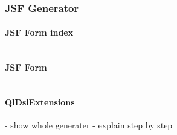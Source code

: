\subsubsection {JSF Generator}
\label{sec:jsfGenerator}
 
 
 \paragraph{JSF Form index}
$\;$ \\ 
\paragraph{JSF Form}
$\;$ \\ 
\paragraph{QlDslExtensions} 
$\;$ \\ 

- show whole generater
- explain step by step